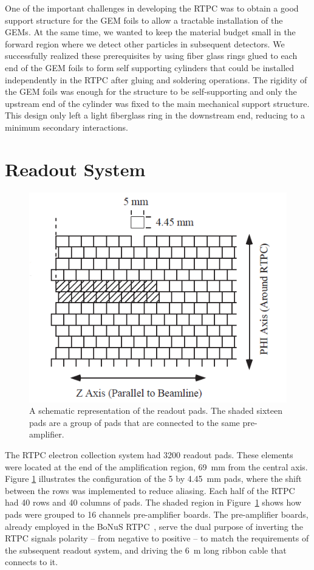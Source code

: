 \documentclass[preprint,5p]{elsarticle}
\begin{document}
One of the important challenges in developing the RTPC was to obtain a good 
support structure for the GEM foils to allow a tractable installation of the 
GEMs. At the same time, we wanted to keep the material budget small in the 
forward region where we detect other particles in subsequent detectors. We 
successfully realized these prerequisites by using fiber glass rings glued to 
each end of the GEM foils to form self supporting cylinders that could be 
installed independently in the RTPC after gluing and soldering operations. The 
rigidity of the GEM foils was enough for the structure to be self-supporting 
and only the upstream end of the cylinder was fixed to the main mechanical 
support structure. This design only left a light fiberglass ring in the 
downstream end, reducing to a minimum secondary interactions.

\section{Readout System} \label{sec_readout}

\begin{figure}[tb]
   \centering
   \includegraphics[scale=0.55]{PADs.png}
   \caption[]{A schematic representation of the readout pads. The 
   shaded sixteen pads are a group of pads that are connected to the same 
pre-amplifier.} \label{fig:PADs}
\end{figure}

The RTPC electron collection system had 3200 readout pads. These elements were
located at the end of the amplification region, 69~mm from the central axis.
Figure \ref{fig:PADs} illustrates the configuration of the 5 by 4.45~mm pads,
where the shift between the rows was implemented to reduce aliasing. Each half 
of the RTPC had 40 rows and 40 columns of pads. The shaded region in 
Figure~\ref{fig:PADs} shows how pads were grouped to 16 channels pre-amplifier 
boards. The pre-amplifier boards, already employed in the BoNuS 
RTPC~\cite{Fenker:2008zz}, serve the dual purpose of inverting the RTPC signals 
polarity -- from negative to positive -- to match the requirements of the 
subsequent readout system, and driving the 6~m long ribbon cable that connects 
to it.
\end{document}
